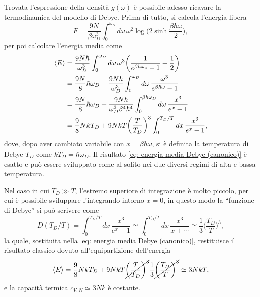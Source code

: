 Trovata l'espressione della densità $g(\omega)$ è possibile adesso ricavare la termodinamica del modello di Debye. Prima di tutto, si calcola l'energia libera
\begin{equation}
    F = \frac{9N}{\beta\omega_D^3}\int_0^{\omega_D}d\omega\,\omega^2\log{\bigg(2\sinh{\frac{\beta\hbar\omega}{2}}\bigg)},
\end{equation}
per poi calcolare l'energia media come
\begin{equation}
\label{eq: energia media Debye (canonico)}
    \begin{split}
        \langle E \rangle &= \frac{9N\hbar}{\omega_D^3}\int_0^{\omega_D}d\omega\,\omega^3\bigg(\frac{1}{e^{\beta\hbar\omega_a} - 1} + \frac{1}{2}\bigg) \\
        &= \frac{9N}{8}\hbar\omega_D + \frac{9N\hbar}{\omega_D^3}\int_0^{\omega_D}d\omega\,\frac{\omega^3}{e^{\beta\hbar\omega} - 1} \\
        &=  \frac{9N}{8}\hbar\omega_D + \frac{9N\hbar}{\omega_D^3\beta^4\hbar^4}\int_0^{\beta\hbar\omega_D}d\omega\,\frac{x^3}{e^x - 1} \\
        &= \frac{9}{8}NkT_D + 9NkT\bigg(\frac{T}{T_D}\bigg)^3\int_0^{T_D/T}dx\,\frac{x^3}{e^x - 1},
    \end{split}
\end{equation}
dove, dopo aver cambiato variabile con $x = \beta\hbar\omega$, si è definita la temperatura di Debye $T_D$ come $kT_D = \hbar\omega_D$. Il risultato \eqref{eq: energia media Debye (canonico)} è esatto e può essere sviluppato come al solito nei due diversi regimi di alta e bassa temperatura.
\setcounter{caso}{0}
\begin{caso}
    Nel caso in cui $T_D \gg T$, l'estremo superiore di integrazione è molto piccolo, per cui è possibile sviluppare l'integrando intorno $x = 0$, in questo modo la ``funzione di Debye'' si può scrivere come
    \begin{equation}
        D(T_D/T) = \int_0^{T_D/T}dx\,\frac{x^3}{e^x - 1} \simeq \int_0^{T_D/T}dx\,\frac{x^3}{x + \cdots} \simeq \frac{1}{3}\bigg(\frac{T_D}{T}\bigg)^3,
    \end{equation}
    la quale, sostituita nella \eqref{eq: energia media Debye (canonico)}, restituisce il risultato classico dovuto all'equipartizione dell'energia
    \begin{equation}
        \langle E \rangle = \frac{9}{8}NkT_D + 9NkT\cancel{\bigg(\frac{T}{T_D}\bigg)^3}\frac{1}{3}\cancel{\bigg(\frac{T_D}{T}\bigg)^3} \simeq 3NkT,
    \end{equation}
    e la capacità termica $c_{V,N} \simeq 3Nk$ è costante.
\end{caso}

